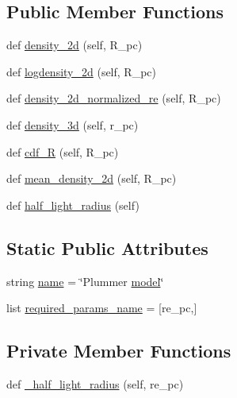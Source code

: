 \subsection*{Public Member Functions}
\begin{DoxyCompactItemize}
\item 
def \hyperlink{classdsph__model_1_1plummer__model_af63912fdaa4af84219a46210ffd8ab92}{density\+\_\+2d} (self, R\+\_\+pc)
\item 
def \hyperlink{classdsph__model_1_1plummer__model_a5e62170fd4065bdc0bab2b032c8c9fa6}{logdensity\+\_\+2d} (self, R\+\_\+pc)
\item 
def \hyperlink{classdsph__model_1_1plummer__model_a73d9b4b17be695ccf81f2259c06e9aa4}{density\+\_\+2d\+\_\+normalized\+\_\+re} (self, R\+\_\+pc)
\item 
def \hyperlink{classdsph__model_1_1plummer__model_ab60395efc8859c48ca5643e54f7e65be}{density\+\_\+3d} (self, r\+\_\+pc)
\item 
def \hyperlink{classdsph__model_1_1plummer__model_a15987917b4f24a022349526405c49a81}{cdf\+\_\+R} (self, R\+\_\+pc)
\item 
def \hyperlink{classdsph__model_1_1plummer__model_a24b8450cd00f5306673580e428a85886}{mean\+\_\+density\+\_\+2d} (self, R\+\_\+pc)
\item 
def \hyperlink{classdsph__model_1_1plummer__model_a17a85f2954201bcef154bbc65c7794fc}{half\+\_\+light\+\_\+radius} (self)
\end{DoxyCompactItemize}
\subsection*{Static Public Attributes}
\begin{DoxyCompactItemize}
\item 
string \hyperlink{classdsph__model_1_1plummer__model_a16dcc9b3cd8290aa250867b0efce5e89}{name} = \char`\"{}Plummer \hyperlink{classdsph__model_1_1model}{model}\char`\"{}
\item 
list \hyperlink{classdsph__model_1_1plummer__model_a6b8e4509e346d34d25831534486047fe}{required\+\_\+params\+\_\+name} = \mbox{[}\textquotesingle{}re\+\_\+pc\textquotesingle{},\mbox{]}
\end{DoxyCompactItemize}
\subsection*{Private Member Functions}
\begin{DoxyCompactItemize}
\item 
def \hyperlink{classdsph__model_1_1plummer__model_adabdd3103020e64743568b23f2fe1131}{\+\_\+half\+\_\+light\+\_\+radius} (self, re\+\_\+pc)
\end{DoxyCompactItemize}
